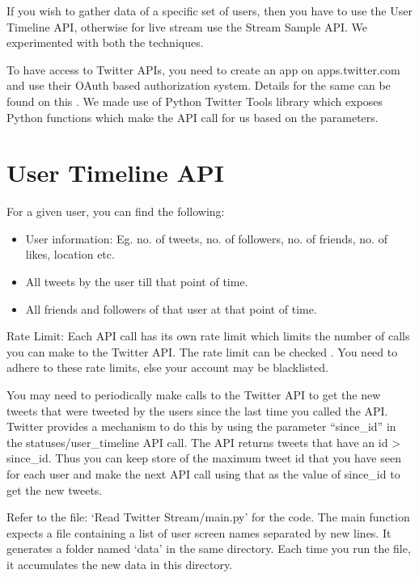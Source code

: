 \documentclass[letterpaper,10pt,english]{sphinxmanual}
\begin{document}
If you wish to gather data of a specific set of users, then you have to use the User Timeline API, otherwise for live stream use the Stream Sample API. We experimented with both the techniques.

To have access to Twitter APIs, you need to create an app on apps.twitter.com and use their OAuth based authorization system. Details for the same can be found on this . We made use of Python Twitter Tools library which exposes Python functions which make the API call for us based on the parameters.


\section{User Timeline API}
\label{\detokenize{twitter_stream:user-timeline-api}}
For a given user, you can find the following:
\begin{itemize}
\item {} 
User information: Eg. no. of tweets, no. of followers, no. of friends, no. of likes, location etc.

\item {} 
All tweets by the user till that point of time.

\item {} 
All friends and followers of that user at that point of time.

\end{itemize}

Rate Limit: Each API call has its own rate limit which limits the number of calls you can make to the Twitter API. The rate limit can be checked . You need to adhere to these rate limits, else your account may be blacklisted.

You may need to periodically make calls to the Twitter API to get the new tweets that were tweeted by the users since the last time you called the API. Twitter provides a mechanism to do this by using the parameter “since\_id” in the statuses/user\_timeline API call. The API returns tweets that have an id \textgreater{} since\_id. Thus you can keep store of the maximum tweet id that you have seen for each user and make the next API call using that as the value of since\_id to get the new tweets.

Refer to the file: ‘Read Twitter Stream/main.py’ for the code. The main function expects a file containing a list of user screen names separated by new lines. It generates a folder named ‘data’ in the same directory. Each time you run the file, it accumulates the new data in this directory.
\end{document}
